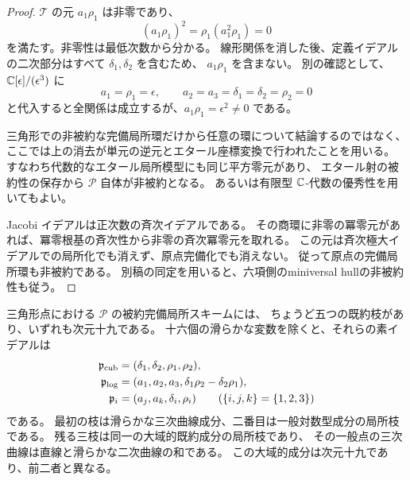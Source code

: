 \begin{proof}
$\mathcal T$ の元 $a_1\rho_1$ は非零であり、
\[
 (a_1\rho_1)^2=\rho_1(a_1^2\rho_1)=0
\]
を満たす。非零性は最低次数から分かる。
線形関係を消した後、定義イデアルの二次部分はすべて $\delta_1,\delta_2$ を含むため、
$a_1\rho_1$ を含まない。
別の確認として、$\mathbb C[\epsilon]/(\epsilon^3)$ に
\[
 a_1=\rho_1=\epsilon,\qquad
 a_2=a_3=\delta_1=\delta_2=\rho_2=0
\]
と代入すると全関係は成立するが、$a_1\rho_1=\epsilon^2\ne0$ である。

三角形での非被約な完備局所環だけから任意の環について結論するのではなく、
ここでは上の消去が単元の逆元とエタール座標変換で行われたことを用いる。
すなわち代数的なエタール局所模型にも同じ平方零元があり、
エタール射の被約性の保存から $\mathscr P$ 自体が非被約となる。
あるいは有限型 $\mathbb C$-代数の優秀性を用いてもよい。

Jacobi イデアルは正次数の斉次イデアルである。
その商環に非零の冪零元があれば、冪零根基の斉次性から非零の斉次冪零元を取れる。
この元は斉次極大イデアルでの局所化でも消えず、原点完備化でも消えない。
従って原点の完備局所環も非被約である。
別稿\cite{VKAmbient32}の同定を用いると、六項側のminiversal hullの非被約性も従う。
\end{proof}

\begin{theorem}
\label{thm:triangle-branches-v32}
三角形点における $\mathscr P$ の被約完備局所スキームには、
ちょうど五つの既約枝があり、いずれも次元十九である。
十六個の滑らかな変数を除くと、それらの素イデアルは
\begin{align*}
 \mathfrak p_{\rm cub}&=(\delta_1,\delta_2,\rho_1,\rho_2),\\
 \mathfrak p_{\rm log}&=(a_1,a_2,a_3,
                  \delta_1\rho_2-\delta_2\rho_1),\\
 \mathfrak p_i&=(a_j,a_k,\delta_i,\rho_i)
       \qquad(\{i,j,k\}=\{1,2,3\})
\end{align*}
である。
最初の枝は滑らかな三次曲線成分、二番目は一般対数型成分の局所枝である。
残る三枝は同一の大域的既約成分の局所枝であり、
その一般点の三次曲線は直線と滑らかな二次曲線の和である。
この大域的成分は次元十九であり、前二者と異なる。
\end{theorem}


